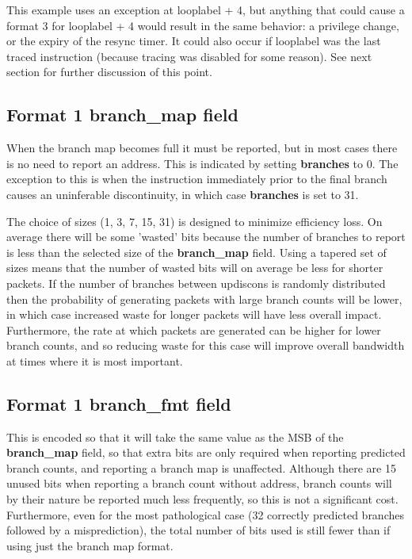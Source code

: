 This example uses an exception at looplabel + 4, but anything that could cause a format 3 for looplabel + 4 would result in 
the same behavior: a privilege change, or the expiry of the resync timer.  It could also occur if looplabel was the last
traced instruction (because tracing was disabled for some reason).  See next section for further discussion of this point.

\subsection{Format 1 \textbf{branch\_map} field}
When the branch map becomes full it must be reported, but in most cases there is no need to report an address.
This is indicated by setting \textbf{branches} to 0.  The exception to this is when the instruction immediately prior to 
the final branch causes an uninferable discontinuity, in which case \textbf{branches} is set to 31.

The choice of sizes (1, 3, 7, 15, 31) is designed to minimize efficiency loss.  On average there will be some 'wasted' bits 
because the number of branches to report is less than the selected size of the \textbf{branch\_map} field.
Using a tapered set of sizes means that the number of wasted bits will on average be less for shorter packets.
If the number of branches between updiscons is randomly distributed then the probability of generating packets with large
branch counts will be lower, in which case increased waste for longer packets will have less overall impact.
Furthermore, the rate at which packets are generated can be higher for lower branch counts, and so reducing
waste for this case will improve overall bandwidth at times where it is most important.

\subsection{Format 1 \textbf{branch\_fmt} field}

This is encoded so that it will take the same value as the MSB of the \textbf{branch\_map} field, so that extra bits are
only required when reporting predicted branch counts, and reporting a branch map is unaffected.  Although there are 15
unused bits when reporting a branch count without address, branch counts will by their nature be reported much less 
frequently, so this is not a significant cost.  Furthermore, even for the most pathological case (32 correctly predicted 
branches followed by a misprediction), the total number of bits used is still fewer than if using just the branch map
format.

